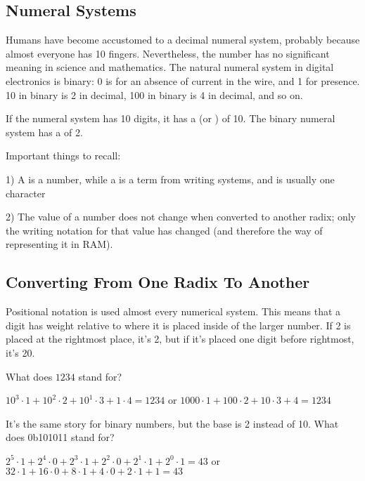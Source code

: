 \subsection{Numeral Systems}

Humans have become accustomed to a decimal numeral system, probably because almost everyone has 10 fingers.
Nevertheless, the number  has no significant meaning in science and mathematics.
The natural numeral system in digital electronics is binary: 0 is for an absence of current in the wire, and 1 for presence.
10 in binary is 2 in decimal, 100 in binary is 4 in decimal, and so on.

If the numeral system has 10 digits, it has a  (or ) of 10.
The binary numeral system has a  of 2.

Important things to recall:

1) A  is a number, while a  is a term from writing systems, and is usually one character

2) The value of a number does not change when converted to another radix; only the writing notation for that value has changed (and therefore the way of representing it in \ac{RAM}).

\subsection{Converting From One Radix To Another}

Positional notation is used almost every numerical system. This means that a digit has weight relative to where it is placed inside of the larger number.
If 2 is placed at the rightmost place, it's 2, but if it's placed one digit before rightmost, it's 20.

What does $1234$ stand for?

$10^3 \cdot 1 + 10^2 \cdot 2 + 10^1 \cdot 3 + 1 \cdot 4 = 1234$ or
$1000 \cdot 1 + 100 \cdot 2 + 10 \cdot 3 + 4 = 1234$

It's the same story for binary numbers, but the base is 2 instead of 10.
What does 0b101011 stand for?

$2^5 \cdot 1 + 2^4 \cdot 0 + 2^3 \cdot 1 + 2^2 \cdot 0 + 2^1 \cdot 1 + 2^0 \cdot 1 = 43$ or
$32 \cdot 1 + 16 \cdot 0 + 8 \cdot 1 + 4 \cdot 0 + 2 \cdot 1 + 1 = 43$

